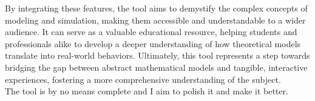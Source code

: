   By integrating these features, the tool aims to demystify the complex concepts of modeling and simulation, making them accessible and understandable to a wider audience. It can serve as a valuable educational resource, helping students and professionals alike to develop a deeper understanding of how theoretical models translate into real-world behaviors. Ultimately, this tool represents a step towards bridging the gap between abstract mathematical models and tangible, interactive experiences, fostering a more comprehensive understanding of the subject.
\\

  The tool is by no means complete and I aim to polish it and make it better.

